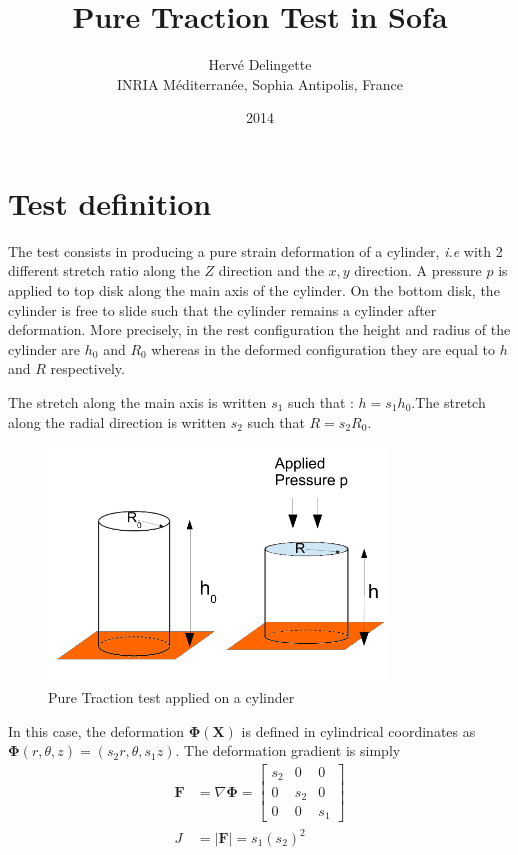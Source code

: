 \documentclass[a4paper,11pt]{article}
\title{Pure Traction Test in Sofa}
\date{2014}
\author{Herv\'e Delingette\\ {\small INRIA M\'editerran\'ee, Sophia Antipolis, France}}
\newcommand{\pos}{{\mathbf X}}
\newcommand{\deformation}{{\mathbf \Phi}}
\newcommand{\defGrad}{{\mathbf F}}
\begin{document}
 
\maketitle

\section{Test definition}

The test consists in producing a pure strain deformation of a cylinder, {\em i.e} with 2 different stretch ratio along the $Z$ direction and the $x,y$ direction.
A pressure $p$ is applied to top disk along the main axis of the cylinder. On the bottom disk, the cylinder is free to slide such that the cylinder remains a cylinder after deformation. More precisely, in the rest configuration the height and radius of the cylinder are $h_0$ and $R_0$ whereas in the deformed configuration they are equal to $h$ and $R$ respectively.

The stretch along the main axis is written   $s_1$ such that : $h=s_1 h_0$.The stretch along the radial direction is written $s_2$ such that  $R=s_2 R_0$.

\begin{figure}[!htbp]
	\centering
    \includegraphics[width=0.80\textwidth]{PureTraction}
	\caption{Pure Traction test applied on a cylinder}
	\label{fig:PureTraction}
\end{figure}

In this case, the deformation $\deformation(\pos)$ is defined in cylindrical coordinates as $\deformation(r,\theta,z)=(s_2 r,\theta,s_1 z)$.
The deformation gradient is simply 
\begin{align*}
\defGrad &=\nabla \deformation=\left [ \begin{array}{ccc} s_2 & 0 & 0 \\0 & s_2 & 0 \\ 0 & 0 & s_1 \end{array} \right ] \\
J &= | \defGrad |= s_1 (s_2)^2 \\
\end{align*}
\end{document}
